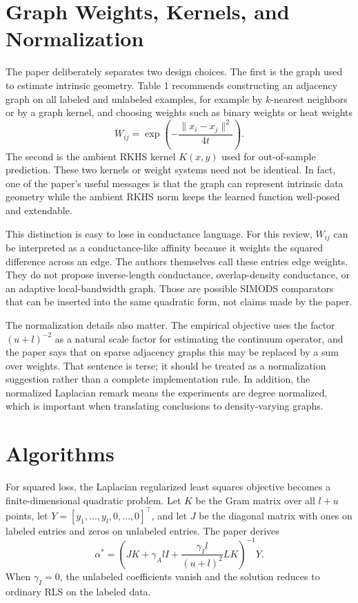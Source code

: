 \documentclass[11pt]{article}
\begin{document}
\section{Graph Weights, Kernels, and Normalization}

The paper deliberately separates two design choices.  The first is the graph
used to estimate intrinsic geometry.  Table 1 recommends constructing an
adjacency graph on all labeled and unlabeled examples, for example by
$k$-nearest neighbors or by a graph kernel, and choosing weights such as
binary weights or heat weights
\[
  W_{ij} = \exp\left(-\frac{\|x_i-x_j\|^2}{4t}\right).
\]
The second is the ambient RKHS kernel $K(x,y)$ used for out-of-sample
prediction.  These two kernels or weight systems need not be identical.  In
fact, one of the paper's useful messages is that the graph can represent
intrinsic data geometry while the ambient RKHS norm keeps the learned function
well-posed and extendable.

This distinction is easy to lose in conductance language.  For this review,
$W_{ij}$ can be interpreted as a conductance-like affinity because it weights
the squared difference across an edge.  The authors themselves call these
entries edge weights.  They do not propose inverse-length conductance,
overlap-density conductance, or an adaptive local-bandwidth graph.  Those are
possible SIMODS comparators that can be inserted into the same quadratic form,
not claims made by the paper.

The normalization details also matter.  The empirical objective uses the
factor $(u+l)^{-2}$ as a natural scale factor for estimating the continuum
operator, and the paper says that on sparse adjacency graphs this may be
replaced by a sum over weights.  That sentence is terse; it should be treated
as a normalization suggestion rather than a complete implementation rule.  In
addition, the normalized Laplacian remark means the experiments are degree
normalized, which is important when translating conclusions to density-varying
graphs.

\section{Algorithms}

For squared loss, the Laplacian regularized least squares objective becomes a
finite-dimensional quadratic problem.  Let $K$ be the Gram matrix over all
$l+u$ points, let $Y=[y_1,\ldots,y_l,0,\ldots,0]^\top$, and let $J$ be the
diagonal matrix with ones on labeled entries and zeros on unlabeled entries.
The paper derives
\[
  \alpha^\ast
  =
  \left(
    JK + \gamma_A l I
    +
    \frac{\gamma_I l}{(u+l)^2}LK
  \right)^{-1}Y .
\]
When $\gamma_I=0$, the unlabeled coefficients vanish and the solution reduces
to ordinary RLS on the labeled data.
\end{document}
